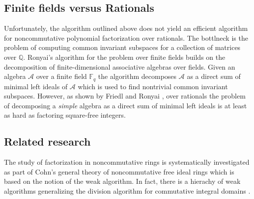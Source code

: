 \documentclass[10pt,a4paper]{article}
\newcommand{\F}{\mathbb{F}}
\newcommand{\Q}{\mathbb{Q}}
\begin{document}

%

\subsection{Finite fields versus Rationals}\label{finite-vs-rationals}

Unfortunately, the algorithm outlined above does not yield an
efficient algorithm for noncommutative polynomial factorization over
rationals. The bottlneck is the problem of computing common invariant
subspaces for a collection of matrices over $\Q$. Ronyai's algorithm
for the problem over finite fields \cite{Ronyai2} builds on the
decomposition of finite-dimensional associative algebras over
fields. Given an algebra $\mathcal{A}$ over a finite field $\F_q$ the
algorithm decomposes $\mathcal{A}$ as a direct sum of minimal left
ideals of $\mathcal{A}$ which is used to find nontrivial common
invariant subspaces. However, as shown by Friedl and Ronyai
\cite{FR85}, over rationals the problem of decomposing a \emph{simple}
algebra as a direct sum of minimal left ideals is at least as hard as
factoring square-free integers.


\subsection{Related research}

The study of factorization in noncommutative rings is systematically
investigated as part of Cohn's general theory of noncommutative free
ideal rings \cite{Cohnfir,Cohnintro} which is based on the notion of
the weak algorithm. In fact, there is a hierachy of weak algorithms
generalizing the division algorithm for commutative integral domains
\cite{Cohnfir}.\smallskip
\end{document}
